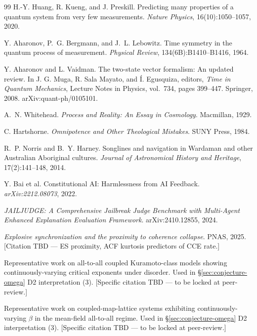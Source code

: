 \documentclass[11pt,a4paper]{article}
\begin{document}
\begin{thebibliography}{99}
 H.-Y. Huang, R. Kueng, and J. Preskill. Predicting many properties of a quantum system from very few measurements. \emph{Nature Physics}, 16(10):1050--1057, 2020.

 Y. Aharonov, P.~G. Bergmann, and J.~L. Lebowitz. Time symmetry in the quantum process of measurement. \emph{Physical Review}, 134(6B):B1410--B1416, 1964.

 Y. Aharonov and L. Vaidman. The two-state vector formalism: An updated review. In J. G. Muga, R. Sala Mayato, and {\'I}. Egusquiza, editors, \emph{Time in Quantum Mechanics}, Lecture Notes in Physics, vol.~734, pages 399--447. Springer, 2008. arXiv:quant-ph/0105101.

 A.~N. Whitehead. \emph{Process and Reality: An Essay in Cosmology}. Macmillan, 1929.

 C. Hartshorne. \emph{Omnipotence and Other Theological Mistakes}. SUNY Press, 1984.

 R.~P. Norris and B.~Y. Harney. Songlines and navigation in Wardaman and other Australian Aboriginal cultures. \emph{Journal of Astronomical History and Heritage}, 17(2):141--148, 2014.

 Y. Bai et al. Constitutional AI: Harmlessness from AI Feedback. \emph{arXiv:2212.08073}, 2022.

 \emph{JAILJUDGE: A Comprehensive Jailbreak Judge Benchmark with Multi-Agent Enhanced Explanation Evaluation Framework}. arXiv:2410.12855, 2024.

 \emph{Explosive synchronization and the proximity to coherence collapse}. PNAS, 2025. [Citation TBD --- ES proximity, ACF kurtosis predictors of CCE rate.]

 Representative work on all-to-all coupled Kuramoto-class models showing continuously-varying critical exponents under disorder. Used in \S\ref{sec:conjecture-omega} D2 interpretation (3). [Specific citation TBD --- to be locked at peer-review.]

 Representative work on coupled-map-lattice systems exhibiting continuously-varying $\beta$ in the mean-field all-to-all regime. Used in \S\ref{sec:conjecture-omega} D2 interpretation (3). [Specific citation TBD --- to be locked at peer-review.]

\end{thebibliography}
\end{document}
